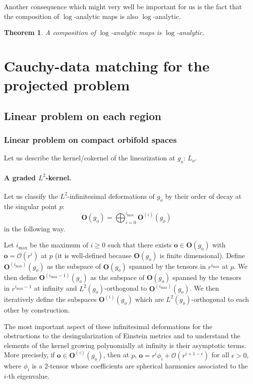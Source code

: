 \documentclass[12pt]{article}
\newtheorem{thm}{Theorem}[section]
\begin{document}
    Another consequence which might very well be important for us is the fact that the composition of $\log$-analytic maps is also $\log$-analytic.    
    
\begin{thm}\label{composition log}
		A composition of $\log$-analytic maps is $\log$-analytic.
\end{thm}


\section{Cauchy-data matching for the projected problem}


\subsection{Linear problem on each region}



\subsubsection{Linear problem on compact orbifold spaces}


Let us describe the kernel/cokernel of the linearization at $g_o$: $L_o$.

\paragraph{A graded $L^2$-kernel.}

Let us classify the $L^2$-infinitesimal deformations of ${g_o}$ by their order of decay at the singular point $p$:
   $$ \mathbf{O}({g_o}) = \bigoplus_{i = 0}^{i_{\max}} \mathbf{O}^{(i)}({g_o}) $$
   in the following way.
   
   Let $i_{\max}$ be the maximum of $i\geqslant 0$ such that there exists $\mathbf{o}\in \mathbf{O}({g_o})$ with $ \mathbf{o} = \mathcal{O}(r^{i}) $ at $p$ (it is well-defined because $\mathbf{O}({g_o})$ is finite dimensional). Define $\mathbf{O}^{(i_{\max})}({g_o})$ as the subspace of $\mathbf{O}({g_o})$ spanned by the tensors in $r^{i_{\max}}$ at $p$. We then define $\mathbf{O}^{(i_{\max}-1)}({g_o})$ as the subspace of $\mathbf{O}({g_o})$ spanned by the tensors in $r^{i_{\max}- 1}$ at infinity and $L^2({g_o})$-orthogonal to $\mathbf{O}^{(i_{\max})}({g_o})$. We then iteratively define the subspaces $\mathbf{O}^{(i)}({g_o})$ which are $L^2({g_o})$-orthogonal to each other by construction.
   
   The most important aspect of these infinitesimal deformations for the obstructions to the desingularization of Einstein metrics and to understand the elements of the kernel growing polynomially at infinity is their asymptotic terms. More precisely, if $\mathbf{o}\in \mathbf{O}^{(i)}({g_o})$, then at $p$, $\mathbf{o} = r^{i} \phi_{i} + \mathcal{O}(r^{i+1-\epsilon})$ for all $\epsilon>0$, where $\phi_{i}$ is a $2$-tensor whose coefficients are spherical harmonics associated to the $i$-th eigenvalue. 
   
\end{document}
